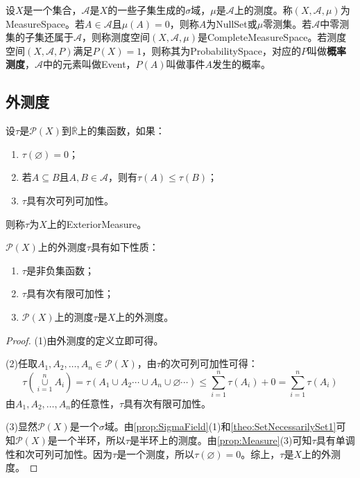 \begin{definition}
	设$X$是一个集合，$\mathscr{A}$是$X$的一些子集生成的$\sigma$域，$\mu$是$\mathscr{A}$上的测度。称$(X,\mathscr{A},\mu)$为\gls{MeasureSpace}。若$A\in\mathscr{A}$且$\mu(A)=0$，则称$A$为\gls{NullSet}或$\mu$零测集。若$\mathscr{A}$中零测集的子集还属于$\mathscr{A}$，则称测度空间$(X,\mathscr{A},\mu)$是\gls{CompleteMeasureSpace}。若测度空间$(X,\mathscr{A},P)$满足$P(X)=1$，则称其为\gls{ProbabilitySpace}，对应的$P$叫做\textbf{概率测度}，$\mathscr{A}$中的元素叫做\gls{Event}，$P(A)$叫做事件$A$发生的概率。
\end{definition}

\subsection{外测度}
\begin{definition}
	设$\tau$是$\mathscr{P}(X)$到$\overline{\mathbb{R}}$上的集函数，如果：
	\begin{enumerate}
		\item $\tau(\varnothing)=0$；
		\item 若$A\subseteq B$且$A,B\in\mathscr{A}$，则有$\tau(A)\leqslant\tau(B)$；
		\item $\tau$具有次可列可加性。
	\end{enumerate}
	则称$\tau$为$X$上的\gls{ExteriorMeasure}。
\end{definition}
\begin{property}\label{prop:ExteriorMeasure}
	$\mathscr{P}(X)$上的外测度$\tau$具有如下性质：
	\begin{enumerate}
		\item $\tau$是非负集函数；
		\item $\tau$具有次有限可加性；
		\item $\mathscr{P}(X)$上的测度$\tau$是$X$上的外测度。
	\end{enumerate}
\end{property}
\begin{proof}
	(1)由外测度的定义立即可得。\par
	(2)任取$A_1,A_2,\dots,A_n\in\mathscr{P}(X)$，由$\tau$的次可列可加性可得：
	\begin{equation*}
		\tau\left(\underset{i=1}{\overset{n}{\cup}}A_i\right)=\tau(A_1\cup A_2\cdots\cup A_n\cup\varnothing\cdots)\leqslant\sum_{i=1}^{n}\tau(A_i)+0=\sum_{i=1}^{n}\tau(A_i)
	\end{equation*}
	由$A_1,A_2,\dots,A_n$的任意性，$\tau$具有次有限可加性。\par
	(3)显然$\mathscr{P}(X)$是一个$\sigma$域。由\cref{prop:SigmaField}(1)和\cref{theo:SetNecessarilySet1}可知$\mathscr{P}(X)$是一个半环，所以$\tau$是半环上的测度。由\cref{prop:Measure}(3)可知$\tau$具有单调性和次可列可加性。因为$\tau$是一个测度，所以$\tau(\varnothing)=0$。综上，$\tau$是$X$上的外测度。
\end{proof}
